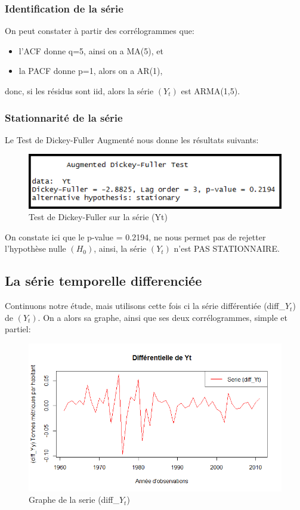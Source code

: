 \documentclass{article}
\begin{document}
\subsubsection{Identification de la série}
On peut constater à partir des corrélogrammes que:
\begin{itemize}
\item l'ACF donne q=5, ainsi on a MA(5), et
\item la PACF donne p=1, alors on a AR(1),
\end{itemize}
donc, si les résidus sont iid, alors la série $(Y_t)$ est ARMA(1,5).

\subsubsection{Stationnarité de la série}
Le Test de Dickey-Fuller Augmenté nous donne les résultats suivants:

\begin{figure}[h!]
\includegraphics[width=\linewidth]{images/Yt_adf.png}
\caption{Test de Dickey-Fuller sur la série (Yt)}
\label{fig:Yt_adf}
\end{figure}

On constate ici que le p-value = 0.2194, ne nous permet pas de rejetter l'hypothèse nulle $(H_0)$, ainsi, la série $(Y_t)$ n'est PAS STATIONNAIRE.

\subsection{La série temporelle differenciée}
Continuons notre étude, mais utilisons cette fois ci la série différentiée (diff{\_}$Y_t$) de $(Y_t)$. On a alors sa graphe, ainsi que ses deux corrélogrammes, simple et partiel: 

\begin{figure}[h!]
\includegraphics[width=\linewidth]{images/diff_Yt.png}
\caption{Graphe de la serie (diff{\_}$Y_t$)}
\label{fig:diff_Yt}
\end{figure}
\end{document}
